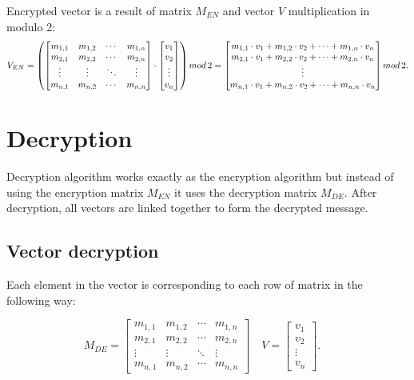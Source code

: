 \documentclass{article}
\begin{document}
    
    Encrypted vector is a result of matrix $M_{EN}$ and vector $V$ multiplication in modulo 2:
    $$V_{EN}= \left(
    \begin{bmatrix}
    m_{1,1} & m_{1,2} & \cdots & m_{1,n} \\
    m_{2,1} & m_{2,2} & \cdots & m_{2,n} \\
    \vdots  & \vdots  & \ddots & \vdots  \\
    m_{n,1} & m_{n,2} & \cdots & m_{n,n} 
    \end{bmatrix}
    \cdot
    \begin{bmatrix}
    v_{1}  \\
    v_{2}  \\
    \vdots   \\
    v_{n}  
    \end{bmatrix}\right)
    mod\,2
    =
    \begin{bmatrix}
    m_{1,1} \color{black}\cdot v_1 \color{black}+ m_{1,2} \color{black}\cdot v_2 \color{black} + \color{black}\cdots \color{black}+ m_{1,n} \color{black}\cdot v_n\\
    m_{2,1} \color{black}\cdot v_1 \color{black}+ m_{2,2} \color{black}\cdot v_2 \color{black} + \color{black}\cdots \color{black}+ m_{2,n} \color{black}\cdot v_n\\
    \vdots   \\
    m_{n,1} \color{black}\cdot v_1 \color{black}+ m_{n,2} \color{black}\cdot v_2 \color{black} + \color{black}\cdots \color{black}+ m_{n,n} \color{black}\cdot v_n
    \end{bmatrix} 
    mod\,2.
    $$

\section{Decryption}
    Decryption algorithm works exactly as the encryption algorithm but instead of using the encryption matrix $M_{EN}$ it uses the decryption matrix $M_{DE}$. After decryption, all vectors are linked together to form the decrypted message.

\subsection{Vector decryption}
    Each element in the vector is corresponding to each row of matrix in the following way:

    $$
    M_{DE}=\begin{bmatrix}
    m_{1,1} & m_{1,2} & \cdots & m_{1,n} \\
    m_{2,1} & m_{2,2} & \cdots & m_{2,n} \\
    \vdots  & \vdots  & \ddots & \vdots  \\
    m_{n,1} & m_{n,2} & \cdots & m_{n,n} 
    \end{bmatrix}\quad
    V=\begin{bmatrix}
    v_{1}  \\
    v_{2}  \\
    \vdots   \\
    v_{n}  
    \end{bmatrix}.
    \quad$$
    
\end{document}
